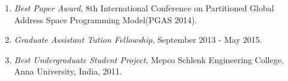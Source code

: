 \begin{enumerate}
\setcounter{enumi}{0}
\item \textit{Best Paper Award}, 8th International Conference on Partitioned
    Global Address Space Programming Model(PGAS 2014).
\item \textit{Graduate Assistant Tution Fellowship}, September 2013 - May 2015.
\item \textit{Best Undergraduate Student Project}, Mepco Schlenk Engineering
    College, Anna University, India, 2011.\\
\end{enumerate}

